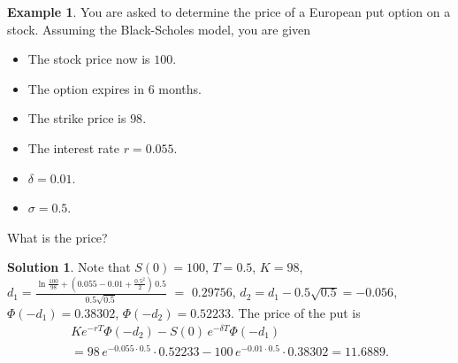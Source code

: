 \documentclass[10pt,handout]{beamer}
\newcommand{\ds}{\displaystyle}
\theoremstyle{definition}
\newtheorem*{ex}{Example}
\newtheorem*{sol}{Solution}
\begin{document}
\begin{frame}{}
  \begin{ex} You are asked to determine the price of a European put option on a stock. Assuming the Black-Scholes model, you are given
    \begin{multicols}{2}
      \begin{itemize}
        \item The stock price now is $100$.
        \item The option expires in $6$ months.
        \item The strike price is $98$.
        \item The interest rate $r = 0.055$.
        \item $\delta = 0.01$.
        \item $\sigma = 0.5$.
      \end{itemize}
    \end{multicols}
    What is the price?
  \end{ex}
  \begin{sol}
    Note that $S(0) = 100$, $T = 0.5$, $K = 98$, $\ds d_1 = \frac{\ln\frac{100}{98} + (0.055 - 0.01 + \frac{0.5^2}{2})\,0.5}{0.5\sqrt{0.5}}$ $=$ $0.29756$, $d_2 = d_1 - 0.5\sqrt{0.5} = -0.056$, $\Phi(-d_1) = 0.38302$, $\Phi(-d_2) = 0.52233$. The price of the put is \vspace{-3mm}
    \begin{multline*}
      Ke^{-rT}\Phi(-d_2) - S(0)\,e^{-\delta T}\Phi(-d_1) \\= 98\,e^{-0.055\cdot 0.5}\cdot 0.52233 - 100\,e^{-0.01\cdot 0.5}\cdot 0.38302 = 11.6889.
    \end{multline*}
  \end{sol}
\end{frame}
\end{document}
